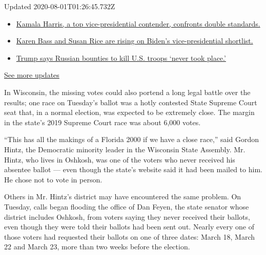 Updated 2020-08-01T01:26:45.732Z

\begin{itemize}
\tightlist
\item
  \href{https://www.nytimes.com/2020/07/31/us/elections/biden-vs-trump.html?action=click\&pgtype=Article\&state=default\&region=MAIN_CONTENT_1\&context=storylines_live_updates\#link-29fdff45}{Kamala
  Harris, a top vice-presidential contender, confronts double
  standards.}
\item
  \href{https://www.nytimes.com/2020/07/31/us/elections/biden-vs-trump.html?action=click\&pgtype=Article\&state=default\&region=MAIN_CONTENT_1\&context=storylines_live_updates\#link-13ec3d9c}{Karen
  Bass and Susan Rice are rising on Biden's vice-presidential
  shortlist.}
\item
  \href{https://www.nytimes.com/2020/07/31/us/elections/biden-vs-trump.html?action=click\&pgtype=Article\&state=default\&region=MAIN_CONTENT_1\&context=storylines_live_updates\#link-49e9a016}{Trump
  says Russian bounties to kill U.S. troops `never took place.'}
\end{itemize}

\href{https://www.nytimes.com/2020/07/31/us/elections/biden-vs-trump.html?action=click\&pgtype=Article\&state=default\&region=MAIN_CONTENT_1\&context=storylines_live_updates}{See
more updates}

In Wisconsin, the missing votes could also portend a long legal battle
over the results; one race on Tuesday's ballot was a hotly contested
State Supreme Court seat that, in a normal election, was expected to be
extremely close. The margin in the state's 2019 Supreme Court race was
about 6,000 votes.

``This has all the makings of a Florida 2000 if we have a close race,''
said Gordon Hintz, the Democratic minority leader in the Wisconsin State
Assembly. Mr. Hintz, who lives in Oshkosh, was one of the voters who
never received his absentee ballot --- even though the state's website
said it had been mailed to him. He chose not to vote in person.

Others in Mr. Hintz's district may have encountered the same problem. On
Tuesday, calls began flooding the office of Dan Feyen, the state senator
whose district includes Oshkosh, from voters saying they never received
their ballots, even though they were told their ballots had been sent
out. Nearly every one of those voters had requested their ballots on one
of three dates: March 18, March 22 and March 23, more than two weeks
before the election.

